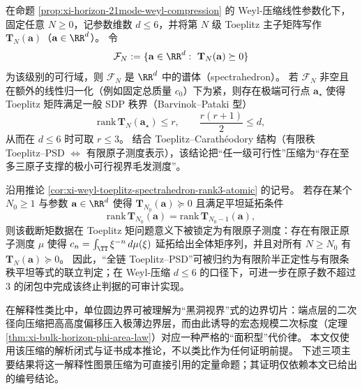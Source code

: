 \begin{corollary}\label{cor:xi-weyl-toeplitz-spectrahedron-rank3-atomic}
在命题 \ref{prop:xi-horizon-21mode-weyl-compression} 的 Weyl-压缩线性参数化下，固定任意 \(N\ge 0\)，记参数维数 \(d\le 6\)，并将第 \(N\) 级 Toeplitz 主子矩阵写作 \(\mathbf{T}_N(\mathbf{a})\)（\(\mathbf{a}\in\RR^d\)）。
令
\[
\mathcal{F}_N:=\{\mathbf{a}\in\RR^{d}:\ \mathbf{T}_N(\mathbf{a})\succeq 0\}
\]
为该级别的可行域，则 \(\mathcal{F}_N\) 是 \(\RR^{d}\) 中的谱体（spectrahedron）。
若 \(\mathcal{F}_N\) 非空且在额外的线性归一化（例如固定总质量 \(c_0\)）下为紧，则存在极端可行点 \(\mathbf{a}_\star\) 使得 Toeplitz 矩阵满足一般 SDP 秩界（Barvinok--Pataki 型）
\[
\mathrm{rank}\,\mathbf{T}_N(\mathbf{a}_\star)\le r,
\qquad
\frac{r(r+1)}{2}\le d,
\]
从而在 \(d\le 6\) 时可取 \(r\le 3\)。
结合 Toeplitz--Carath\'eodory 结构（有限秩 Toeplitz--PSD \(\Longleftrightarrow\) 有限原子测度表示），该结论把“任一级可行性”压缩为“存在至多三原子支撑的极小可行视界毛发测度”。
\end{corollary}

\begin{corollary}\label{cor:xi-toeplitz-flat-extension-finite-termination}
沿用推论 \ref{cor:xi-weyl-toeplitz-spectrahedron-rank3-atomic} 的记号。
若存在某个 \(N_0\ge 1\) 与参数 \(\mathbf{a}\in\RR^d\) 使得 \(\mathbf{T}_{N_0}(\mathbf{a})\succeq 0\) 且满足平坦延拓条件
\[
\mathrm{rank}\,\mathbf{T}_{N_0}(\mathbf{a})=\mathrm{rank}\,\mathbf{T}_{N_0-1}(\mathbf{a}),
\]
则该截断矩数据在 Toeplitz 矩问题意义下被锁定为有限原子测度：存在有限正原子测度 \(\mu\) 使得 \(c_n=\int_{\TT}\xi^{-n}\,d\mu(\xi)\) 延拓给出全体矩序列，并且对所有 \(N\ge N_0\) 有 \(\mathbf{T}_N(\mathbf{a})\succeq 0\)。
因此，“全链 Toeplitz--PSD”可被归约为有限阶半正定性与有限条秩平坦等式的联立判定；在 Weyl-压缩 \(d\le 6\) 的口径下，可进一步在原子数不超过 \(3\) 的闭包中完成该终止判据的可审计实现。
\end{corollary}

在解释性类比中，单位圆边界可被理解为“黑洞视界”式的边界切片：端点层的二次径向压缩把高高度偏移压入极薄边界层，而由此诱导的宏态规模二次标度（定理 \ref{thm:xi-bulk-horizon-phi-area-law}）对应一种严格的“面积型”代价律。
本文仅使用该压缩的解析闭式与证书成本推论，不以类比作为任何证明前提。
下述三项主要结果将这一解释性图景压缩为可直接引用的定量命题；其证明仅依赖本文已给出的编号结论。

